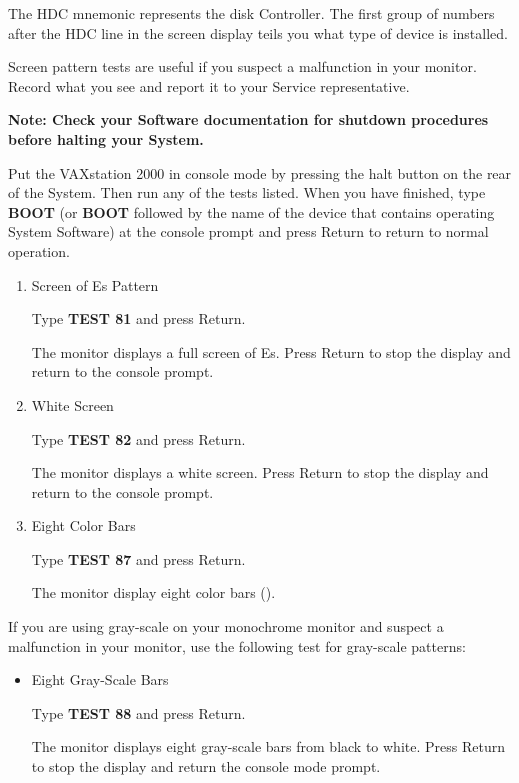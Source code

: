 \documentclass{dec}
\begin{document}
The HDC mnemonic represents the disk Controller. The first group of numbers
after the HDC line in the screen display teils you what type of device is
installed.


Screen pattern tests are useful if you suspect a malfunction in your monitor.
Record what you see and report it to your Service representative.

\textbf{Note: Check your Software documentation for shutdown procedures before halting your System.}

Put the VAXstation 2000 in console mode by pressing the halt button on the
rear of the System. Then run any of the tests listed. When you have finished,
type \textbf{BOOT} (or \textbf{BOOT} followed by the name of the device that contains
operating System Software) at the console prompt and press Return to return
to normal operation.

\newpage

\begin{enumerate}
\item Screen of Es Pattern

Type \textbf{TEST 81} and press Return.

The monitor displays a full screen of Es. Press Return to stop the display and return to the console prompt.

\item White Screen

Type \textbf{TEST 82} and press Return.

The monitor displays a white screen. Press Return to stop the display and return to the console prompt.

\item Eight Color Bars

Type \textbf{TEST 87} and press Return.

The monitor display eight color bars ().
\end{enumerate}



If you are using gray-scale on your monochrome monitor and suspect a
malfunction in your monitor, use the following test for gray-scale patterns:
\begin{itemize}
\item Eight Gray-Scale Bars

Type \textbf{TEST 88} and press Return.

The monitor displays eight gray-scale bars from black to white.
 Press Return to stop the display and return the console mode prompt.
\end{itemize}
\end{document}
